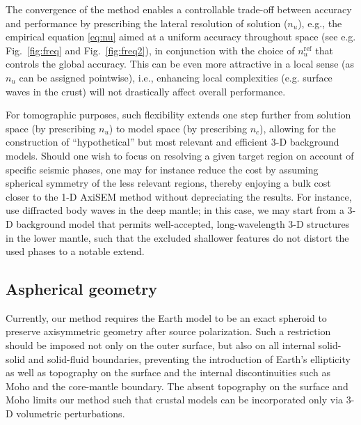 \documentclass[extra,referee]{gji}
\begin{document}
The convergence of the method enables a controllable 
trade-off between accuracy and performance by prescribing the lateral
resolution of solution ($n_u$), e.g., 
the empirical equation \eqref{eq:nu} aimed at a uniform
accuracy throughout space (see e.g. Fig.~\ref{fig:freq} and Fig.~\ref{fig:freq2}), 
in conjunction with the choice of $n_u^\text{ref}$  
that controls the global accuracy.
This can be even more attractive in a local sense 
(as $n_u$ can be assigned pointwise), i.e., enhancing local complexities   
(e.g. surface waves in the crust) will not drastically affect overall 
performance.

For tomographic purposes, such flexibility extends one step further from solution 
space (by prescribing $n_u$) to model space (by prescribing $n_c$), allowing 
for the construction of ``hypothetical'' but 
most relevant and efficient 3-D background models.
Should one wish to focus on resolving 
a given target region on account of specific seismic phases, 
one may for instance reduce the cost by assuming spherical symmetry of 
the less relevant regions, thereby enjoying a bulk cost closer to the 1-D 
AxiSEM method without depreciating the results.
For instance, \cite{hosseini2015multifrequency} use diffracted body waves 
in the deep mantle; in this case, we may start from a 3-D background model 
that permits well-accepted, long-wavelength 3-D structures in the lower 
mantle, such that the excluded shallower features do not distort the 
used phases to a notable extend.

\subsection{Aspherical geometry}
\label{sec:geo}
Currently, our method requires the Earth model to be an exact 
spheroid to preserve axisymmetric geometry after source polarization. 
Such a restriction should be imposed not only on the outer surface, 
but also on all internal solid-solid and solid-fluid boundaries, 
preventing the introduction of Earth's ellipticity as well as topography 
on the surface and the internal discontinuities such as Moho and 
the core-mantle boundary.
The absent topography on the surface and Moho limits our method such that 
crustal models can be incorporated only via 3-D volumetric perturbations. 
\end{document}
